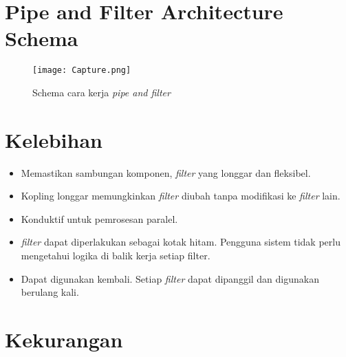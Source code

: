 	
	\section{Pipe and Filter Architecture Schema
	}
		\begin{figure}[h] 
		\begin{center} 
			\renewcommand{\figurename}{Gambar} 
			\texttt{[image: Capture.png]} 
			\caption{Schema cara kerja \textit{pipe and filter}} 
			\label{unhas} 
		\end{center} 
	\end{figure}
	
	\section{Kelebihan}
	
	\begin{itemize}
		\item Memastikan sambungan komponen, \textit{filter} yang longgar dan fleksibel.
		\item Kopling longgar memungkinkan \textit{filter} diubah tanpa modifikasi ke \textit{filter} lain.
		\item Konduktif untuk pemrosesan paralel.
		\item\textit{filter} dapat diperlakukan sebagai kotak hitam. Pengguna sistem tidak perlu mengetahui logika di balik kerja setiap filter.
		\item Dapat digunakan kembali. Setiap \textit{filter} dapat dipanggil dan digunakan berulang kali.
	\end{itemize}
	
	
	\section{Kekurangan}
	
